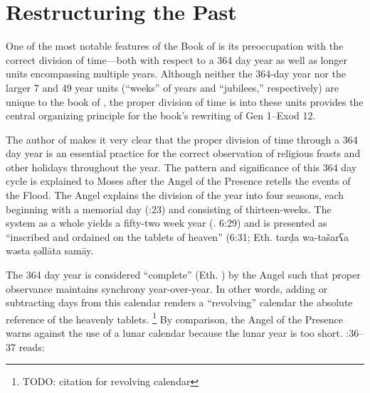 
\section{Restructuring the Past}

One of the most notable features of the Book of \jub is its preoccupation with the correct division of time---both with respect to a 364 day year as well as longer units encompassing multiple years. Although neither the 364-day year nor the larger 7 and 49 year units (``weeks'' of years and ``jubilees,'' respectively) are unique to the book of \jub, the proper division of time is into these units provides the central organizing principle for the book's rewriting of Gen 1--Exod 12.

The author of \jub makes it very clear that the proper division of time through a 364 day year is an essential practice for the correct observation of religious feasts and other holidays throughout the year. The pattern and significance of this 364 day cycle is explained to Moses after the Angel of the Presence retells the events of the Flood. The Angel explains the division of the year into four seasons, each beginning with a memorial day (:23) and consisting of thirteen-weeks. The system as a whole yields a fifty-two week year (\jub. 6:29) and is presented as ``inscribed and ordained on the tablets of heaven'' (6:31; Eth.
        {tarḍa wa-tašarʕa wəsta ṣəllāta samāy}.

The 364 day year is considered ``complete'' (Eth. ) by the Angel such that proper observance maintains synchrony year-over-year. In other words, adding or subtracting days from this calendar renders a ``revolving'' calendar \visavis the absolute reference of the heavenly tablets.%
    \footnote{TODO: citation for revolving calendar}
By comparison, the Angel of the Presence warns against the use of a lunar calendar because the lunar year is too short. :36--37 reads:

